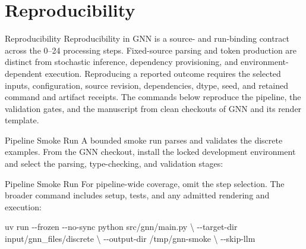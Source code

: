 \documentclass[
  ignorenonframetext,
]{beamer}
\author{\texorpdfstring{}{}}
\date{}
\newenvironment{Shaded}{}{}
\newcommand{\AttributeTok}[1]{\textcolor[rgb]{0.49,0.56,0.16}{#1}}
\newcommand{\DataTypeTok}[1]{\textcolor[rgb]{0.56,0.13,0.00}{#1}}
\newcommand{\ExtensionTok}[1]{#1}
\newcommand{\FunctionTok}[1]{\textcolor[rgb]{0.02,0.16,0.49}{#1}}
\newcommand{\NormalTok}[1]{#1}
\newcommand{\StringTok}[1]{\textcolor[rgb]{0.25,0.44,0.63}{#1}}
\newcommand{\VariableTok}[1]{\textcolor[rgb]{0.10,0.09,0.49}{#1}}
\begin{document}
\section{Reproducibility}\label{sec:reproducibility}

\begin{frame}[allowframebreaks]{Reproducibility}
Reproducibility in GNN is a source- and run-binding contract across the
0--24 processing steps. Fixed-source parsing and token production are
distinct from stochastic inference, dependency provisioning, and
environment-dependent execution. Reproducing a reported outcome requires
the selected inputs, configuration, source revision, dependencies,
dtype, seed, and retained command and artifact receipts. The commands
below reproduce the pipeline, the validation gates, and the manuscript
from clean checkouts of GNN and its render template.
\end{frame}

\begin{frame}{Pipeline Smoke Run}
\protect{}\label{pipeline-smoke-run}
A bounded smoke run parses and validates the discrete examples. From the
GNN checkout, install the locked development environment and select the
parsing, type-checking, and validation stages:

\begin{Shaded}
\end{Shaded}

\end{frame}

\begin{frame}{Pipeline Smoke Run}
For pipeline-wide coverage, omit the step selection. The broader command
includes setup, tests, and any admitted rendering and execution:

\begin{Shaded}
\begin{Highlighting}[]
\ExtensionTok{uv}\NormalTok{ run }\AttributeTok{{-}{-}frozen} \AttributeTok{{-}{-}no{-}sync}\NormalTok{ python src/gnn/main.py }\DataTypeTok{\textbackslash{}}
  \AttributeTok{{-}{-}target{-}dir}\NormalTok{ input/gnn\_files/discrete }\DataTypeTok{\textbackslash{}}
  \AttributeTok{{-}{-}output{-}dir}\NormalTok{ /tmp/gnn{-}smoke }\DataTypeTok{\textbackslash{}}
  \AttributeTok{{-}{-}skip{-}llm}
\end{Highlighting}
\end{Shaded}

\end{frame}
\end{document}
